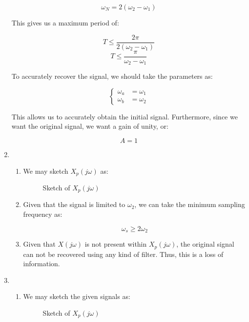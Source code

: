 \begin{enumerate}
    $$\omega_N=2(\omega_2-\omega_1)$$

    This gives us a maximum period of:

    $$T\leq\frac{2\pi}{2(\omega_2-\omega_1)}$$
    $$\boxed{T\leq\frac{\pi}{\omega_2-\omega_1}}$$

    To accurately recover the signal, we should take the parameters as:

    $$\boxed{\left\{\begin{array}{ll}\omega_a &= \omega_1\\\omega_b&= \omega_2 \end{array}}$$

    This allows us to accurately obtain the initial signal. Furthermore, since we want the original signal, we want a gain of unity, or:

    $$\boxed{A=1}$$

  \item

    \begin{enumerate}

      \item We may sketch $X_p(j\omega)$ as:

        \begin{figure}[H]
          \centering
          
          \caption{Sketch of $X_p(j\omega)$}
          \label{fig:1}
        \end{figure}

      \item Given that the signal is limited to $\omega_2$, we can take the minimum sampling frequency as:

        $$\boxed{\omega_s\geq 2\omega_2}$$

      \item Given that $X(j\omega)$ is not present within $X_p(j\omega)$, the original signal can not be recovered using any kind of filter. Thus, this is a loss of information.

    \end{enumerate}

  \item

    \begin{enumerate}

      \item We may sketch the given signals as:

        \begin{figure}[H]
          \centering
          
          \caption{Sketch of $X_p(j\omega)$}
          \label{fig:2}
        \end{figure}


\end{enumerate}
\end{enumerate}
